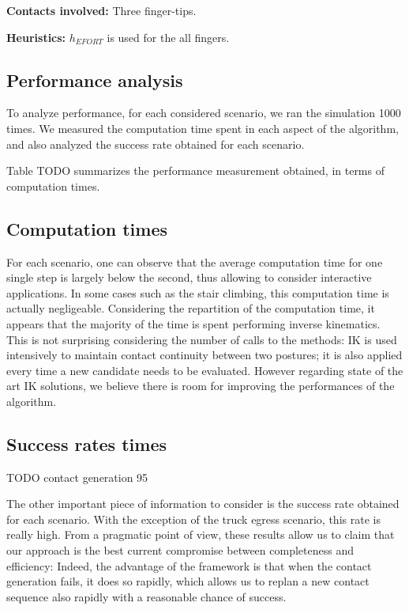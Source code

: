  
\noindent\textbf{Contacts involved:} Three finger-tips.

\noindent\textbf{Heuristics:} $h_{EFORT}$ is used for the all fingers.
 
 
\subsection{Performance analysis} \label{sec:perf}
To analyze performance, for each considered scenario, we ran the simulation 1000 times.
We measured the computation time spent in each aspect of the algorithm, and also analyzed the success
rate obtained for each scenario.

Table TODO summarizes the performance measurement obtained, in terms of computation times.


\subsection{Computation times}
For each scenario, one can observe that the average computation time for one single step is largely below the second,
thus allowing to consider interactive applications. In some cases such as the stair climbing, this computation time is actually negligeable. 
Considering the repartition of the computation time, it appears that the majority of the time is spent performing inverse kinematics.
This is not surprising considering the number of calls to the methods: IK is used intensively to maintain contact continuity between two postures; 
it is also applied every time a new candidate needs to be evaluated. However regarding state of the art IK solutions, we believe there is room
for improving the performances of the algorithm.

\subsection{Success rates times}
TODO contact generation 95 %

The other important piece of information to consider is the success rate obtained for each scenario.
With the exception of the truck egress scenario, this rate is really high.
From a pragmatic point of view, these results allow us to claim that our approach is the best current compromise between completeness and efficiency:
Indeed, the advantage of the framework is that when the contact generation fails, it does so rapidly, which allows us to replan a new contact sequence also rapidly with 
a reasonable chance of success.

